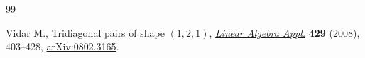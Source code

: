\begin{thebibliography}{99}

Vidar M.,
Tridiagonal pairs of shape $(1,2,1)$,
\href{http://dx.doi.org/10.1016/j.laa.2008.02.034}{{\it Linear Algebra Appl.}} {\bf 429} (2008), 403--428,
\href{http://arxiv.org/abs/0802.3165}{arXiv:0802.3165}.

\end{thebibliography}
